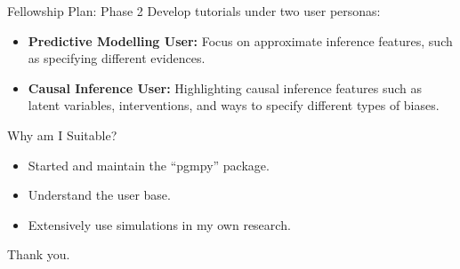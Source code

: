 \documentclass{beamer}
\begin{document}
\begin{frame}{Fellowship Plan: Phase 2}
	Develop tutorials under two user personas:

	\vspace{2em}

	\begin{itemize}
		\item \textbf{Predictive Modelling User:} Focus on approximate inference features, such as specifying different evidences.
		\vspace{1em}
		\item \textbf{Causal Inference User:} Highlighting causal inference features such as latent variables, interventions, and ways to specify different types of biases.
	\end{itemize}
\end{frame}

\begin{frame}{Why am I Suitable?}
	\begin{itemize}
		\item Started and maintain the ``pgmpy'' package.
		\item Understand the user base. 
		\item Extensively use simulations in my own research.
	\end{itemize}
\end{frame}

\begin{frame}
	\huge{Thank you.}
\end{frame}
\end{document}
